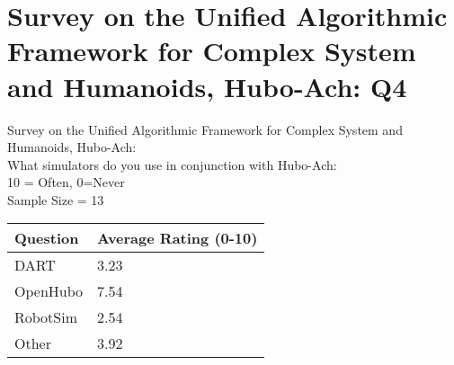\chapter{Survey on the Unified Algorithmic Framework for Complex System and Humanoids, Hubo-Ach: Q4}\label{abs:q4}
\Large
\centering
Survey on the Unified Algorithmic Framework for Complex System and Humanoids, Hubo-Ach:\\
What simulators do you use in conjunction with Hubo-Ach:\\
\small
10 = Often, 0=Never\\
Sample Size = 13\\
\normalsize
\begin{longtable}{|p{9cm} | p{3cm} | }
\hline
Question	&	Average Rating (0-10)	\\	\hline
\hline
\hline
DART		& 	3.23 \\
\hline
OpenHubo	&	7.54\\
\hline
RobotSim	&	2.54 \\
\hline		
Other		&	3.92 \\
\hline


\end{longtable}


